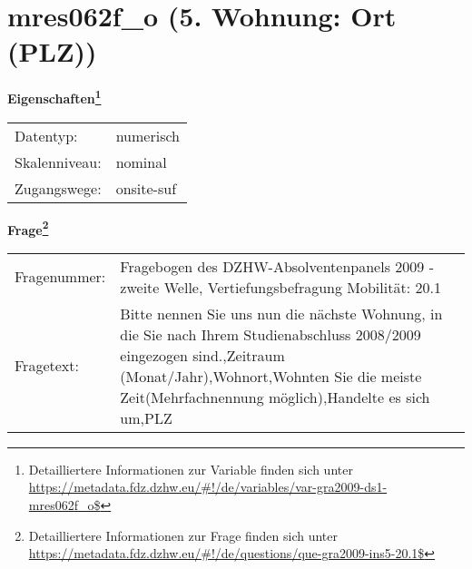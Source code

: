 
    \setcounter{footnote}{0}

    \vspace*{-1.8cm}
	\section{mres062f\_o (5. Wohnung: Ort (PLZ))}
	\label{section:mres062f_o}



    \vspace*{0.5cm}
    \noindent\textbf{Eigenschaften\footnote{Detailliertere Informationen zur Variable finden sich unter
		\url{https://metadata.fdz.dzhw.eu/\#!/de/variables/var-gra2009-ds1-mres062f_o$}}}\\
	\begin{tabularx}{\hsize}{@{}lX}
	Datentyp: & numerisch \\
	Skalenniveau: & nominal \\
	Zugangswege: &
	  onsite-suf
 \\
    \end{tabularx}



				\vspace*{0.5cm}
                \noindent\textbf{Frage\footnote{Detailliertere Informationen zur Frage finden sich unter
		              \url{https://metadata.fdz.dzhw.eu/\#!/de/questions/que-gra2009-ins5-20.1$}}}\\
				\begin{tabularx}{\hsize}{@{}lX}
					Fragenummer: &
					  Fragebogen des DZHW-Absolventenpanels 2009 - zweite Welle, Vertiefungsbefragung Mobilität:
					  20.1
 \\
					Fragetext: & Bitte nennen Sie uns nun die nächste Wohnung, in die Sie nach Ihrem Studienabschluss 2008/2009 eingezogen sind.,Zeitraum (Monat/Jahr),Wohnort,Wohnten Sie die meiste Zeit(Mehrfachnennung möglich),Handelte es sich um,PLZ \\
				\end{tabularx}





